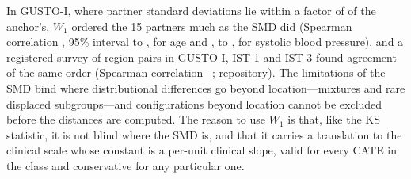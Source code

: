 \documentclass[AMA,Times1COL]{WileyNJDv5}
\begin{document}
In GUSTO-I, where partner standard deviations lie within a factor of  of the anchor's, $W_1$ ordered the 15 partners much as the SMD did (Spearman correlation , 95\% interval  to , for age and ,  to , %
for systolic blood pressure), and a registered survey of region pairs in GUSTO-I,\cite{gusto1993} IST-1\cite{ist1_2000} and IST-3\cite{ist3_2012} found agreement of the same order (Spearman correlation --; repository). The limitations of the SMD bind where distributional differences go beyond location---mixtures and rare displaced subgroups---and configurations beyond location cannot be excluded before the distances are computed. The reason to use $W_1$ is that, like the KS statistic, it is not blind where the SMD is, and that it carries a translation to the clinical scale whose constant is a per-unit clinical slope, valid for every CATE in the class and conservative for any particular one.

\end{document}
